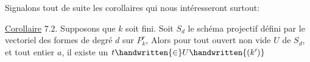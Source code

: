 Signalons tout de suite les corollaires qui nous intéresseront surtout:

\uline{Corollaire} 7.2. Supposons que $k$ soit fini. Soit $S_d$ le schéma projectif défini par le vectoriel des formes de degré $d$ sur $P^r_k$, Alors pour tout ouvert non vide $U$ de $S_d$, et tout entier $a$, il existe un  $t\handwritten{\in}U\handwritten{(k')}$ 
